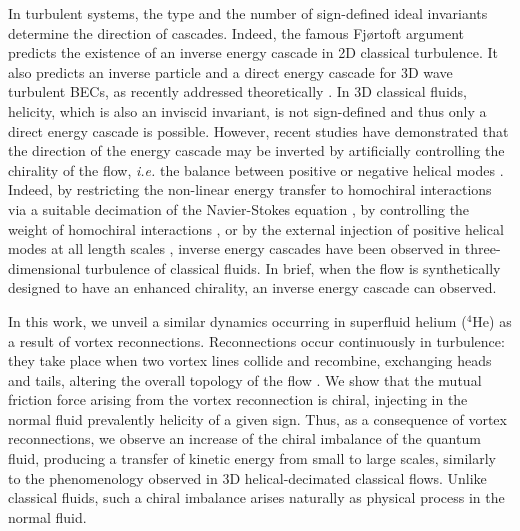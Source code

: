 \documentclass[%
 reprint,
 amsmath,amssymb,
 aps,
 prl,
]{revtex4-2}
\begin{document}
{In turbulent systems, the type and the number of sign-defined ideal invariants determine the direction of cascades. Indeed, the famous 
Fjørtoft argument \cite{fjortoft1953changes} predicts 
the existence of an inverse energy cascade
in 2D classical turbulence. 
It also predicts an inverse particle and a direct energy cascade 
for 3D wave turbulent BECs, as recently addressed theoretically \cite{Zhu_DirectInverseCascades_2023}. In 3D classical fluids, helicity, which is also an inviscid invariant, is not sign-defined and thus only a direct energy cascade is possible. However, recent studies have demonstrated that the direction of the energy 
cascade may be inverted by artificially controlling the chirality of the 
flow, \textit{i.e.} the balance between positive or negative helical 
modes \cite{moffatt1969}.
Indeed, by restricting the non-linear energy transfer to homochiral 
interactions via a suitable decimation of the Navier-Stokes equation 
\cite{biferaleInverseEnergyCascade2012a,biferale-etal-2013}, by
controlling the weight of homochiral interactions \cite{sahoo-etal-2017},
or by the external injection 
of positive helical modes at all length scales 
\cite{plunianInverseCascadeEnergy2020a}, inverse energy cascades 
have been observed in three-dimensional turbulence of classical fluids. 
In brief, when the flow is synthetically designed to have an 
enhanced chirality, an inverse energy cascade can observed.


In this work, we unveil a similar dynamics occurring in superfluid helium
($^4$He) as a result of vortex reconnections.  
Reconnections occur continuously in turbulence: they take place when
two vortex lines collide and recombine, exchanging heads and tails, 
altering the overall topology of the flow
\cite{koplik-levine-1993,bewley-etal-2008,rorai-etal-2016,serafini-etal-2017,galantucci-baggaley-parker-barenghi-2019,villoisUniversalNonuniversalAspects2017,villois2020irreversible}. 
We show that the mutual friction force arising from the  
vortex reconnection is chiral, injecting in the normal fluid prevalently 
helicity of a given sign. Thus, as a consequence of vortex reconnections,
we observe an increase of the chiral imbalance of the quantum fluid, producing a transfer of kinetic energy from small to large scales, similarly to the phenomenology observed in 3D helical-decimated classical flows. 
 Unlike classical fluids, such a chiral imbalance arises naturally as physical process in the normal fluid.%

}
\end{document}
